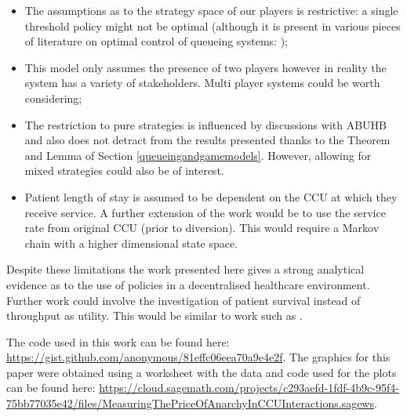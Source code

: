\documentclass{article}
\begin{document}
\begin{itemize}
    \item The assumptions as to the strategy space of our players is restrictive: a single threshold policy might not be optimal (although it is present in various pieces of literature on optimal control of queueing systems: \cite{naor1969regulation, shone2013comparisons});
    \item This model only assumes the presence of two players however in reality the system has a variety of stakeholders. Multi player systems could be worth considering;
    \item The restriction to pure strategies is influenced by discussions with ABUHB and also does not detract from the results presented thanks to the Theorem and Lemma of Section \ref{queueingandgamemodels}.  However, allowing for mixed strategies could also be of interest.
    \item Patient length of stay is assumed to be dependent on the CCU at which they receive service. A further extension of the work would be to use the service rate from original CCU (prior to diversion). This would require a Markov chain with a higher dimensional state space.
\end{itemize}

Despite these limitations the work presented here gives a strong analytical evidence as to the use of policies in a decentralised healthcare environment.
Further work could involve the investigation of patient survival instead of throughput as utility.
This would be similar to work such as \cite{erkut2008ambulance, knight2012ambulance}.

The code used in this work can be found here: \url{https://gist.github.com/anonymous/81effc06eea70a9e4e2f}.
The graphics for this paper were obtained using \cite{Hunter:2007, sage} a worksheet with the data and code used for the plots can be found here: \url{https://cloud.sagemath.com/projects/c293aefd-1fdf-4b9c-95f4-75bb77035e42/files/MeasuringThePriceOfAnarchyInCCUInteractions.sagews}.

\newpage


\end{document}
